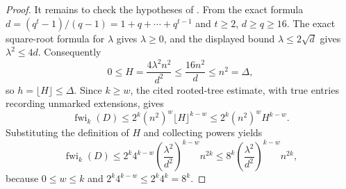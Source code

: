 \begin{proof}
It remains to check the hypotheses of .  From
the exact formula $d=(q^t-1)/(q-1)=1+q+\cdots+q^{t-1}$ and $t\geq2$,
$d\geq q\geq16$.  The exact square-root formula for $\lambda$ gives
$\lambda\geq0$, and the displayed bound $\lambda\leq2\sqrt d$ gives
$\lambda^2\leq4d$.  Consequently
\[
 0\leq H=\frac{4\lambda^2n^2}{d^2}\leq\frac{16n^2}{d}\leq n^2=\Delta,
\]
so $h=\lfloor H\rfloor\leq\Delta$.  Since $k\geq w$, the cited
rooted-tree estimate, with true entries recording unmarked extensions,
gives
\[
 \operatorname{fwi}_k(D)
 \leq 2^k(n^2)^w\lfloor H\rfloor^{k-w}
 \leq 2^k(n^2)^w H^{k-w}.
\]
Substituting the definition of $H$ and collecting powers yields
\[
 \operatorname{fwi}_k(D)
 \leq 2^k4^{k-w}
 \left(\frac{\lambda^2}{d^2}\right)^{k-w}n^{2k}
 \leq 8^k
 \left(\frac{\lambda^2}{d^2}\right)^{k-w}n^{2k},
\]
because $0\leq w\leq k$ and $2^k4^{k-w}\leq2^k4^k=8^k$.
\end{proof}
